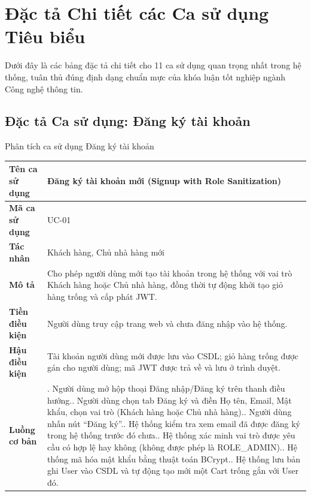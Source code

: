 \documentclass{uetgraduation}
\begin{document}
\clearpage
\section{Đặc tả Chi tiết các Ca sử dụng Tiêu biểu}
Dưới đây là các bảng đặc tả chi tiết cho 11 ca sử dụng quan trọng nhất trong hệ thống, tuân thủ đúng định dạng chuẩn mực của khóa luận tốt nghiệp ngành Công nghệ thông tin.

\subsection{Đặc tả Ca sử dụng: Đăng ký tài khoản}
\begin{table}[!htbp]{Phân tích ca sử dụng Đăng ký tài khoản}
\centering
\small
\begin{tabularx}{\textwidth}{|l|>{\raggedright\arraybackslash}X|}
\hline
\textbf{Tên ca sử dụng} & \textbf{Đăng ký tài khoản mới (Signup with Role Sanitization)} \\ \hline
\textbf{Mã ca sử dụng} & UC-01 \\ \hline
\textbf{Tác nhân} & Khách hàng, Chủ nhà hàng mới \\ \hline
\textbf{Mô tả} & Cho phép người dùng mới tạo tài khoản trong hệ thống với vai trò Khách hàng hoặc Chủ nhà hàng, đồng thời tự động khởi tạo giỏ hàng trống và cấp phát JWT. \\ \hline
\textbf{Tiền điều kiện} & Người dùng truy cập trang web và chưa đăng nhập vào hệ thống. \\ \hline
\textbf{Hậu điều kiện} & Tài khoản người dùng mới được lưu vào CSDL; giỏ hàng trống được gán cho người dùng; mã JWT được trả về và lưu ở trình duyệt. \\ \hline
\textbf{Luồng cơ bản} & 
1. Người dùng mở hộp thoại Đăng nhập/Đăng ký trên thanh điều hướng.\newline
2. Người dùng chọn tab Đăng ký và điền Họ tên, Email, Mật khẩu, chọn vai trò (Khách hàng hoặc Chủ nhà hàng).\newline
3. Người dùng nhấn nút ``Đăng ký''.\newline
4. Hệ thống kiểm tra xem email đã được đăng ký trong hệ thống trước đó chưa.\newline
5. Hệ thống xác minh vai trò được yêu cầu có hợp lệ hay không (không được phép là ROLE\_ADMIN).\newline
6. Hệ thống mã hóa mật khẩu bằng thuật toán BCrypt.\newline
7. Hệ thống lưu bản ghi User vào CSDL và tự động tạo mới một Cart trống gắn với User đó.\newline

\end{tabularx}
\end{table}
\end{document}
